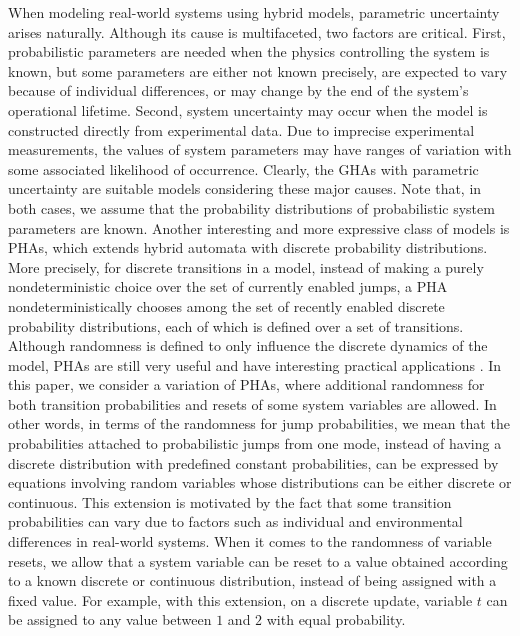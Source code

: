 \vspace{-.2cm}
When modeling real-world systems using hybrid models, parametric uncertainty arises naturally. Although its cause is multifaceted, two factors are critical. First, probabilistic parameters are needed when the physics controlling the system is known, but some parameters are either not known precisely, are expected to vary because of individual differences, or may change by the end of the system's operational lifetime. Second, system uncertainty may occur when the model is constructed directly from experimental data. Due to imprecise experimental measurements, the values of system parameters may have ranges of variation with some associated likelihood of occurrence. Clearly, the GHAs with parametric uncertainty are suitable models considering these major causes. Note that, in both cases, we assume that the probability distributions of probabilistic system parameters are known. Another interesting and more expressive class of models is PHAs, which extends hybrid automata \cite{henzinger2000theory} with discrete probability distributions. More precisely, for discrete transitions in a model, instead of making a purely nondeterministic choice over the set of currently enabled jumps, a PHA nondeterministically chooses among the set of recently enabled discrete probability distributions, each of which is defined over a set of transitions. Although randomness is defined to only influence the discrete dynamics of the model, PHAs are still very useful and have interesting practical applications \cite{spr2001thesis}. In this paper, we consider a variation of PHAs, where additional randomness for both transition probabilities and resets of some system variables are allowed. In other words, in terms of the randomness for jump probabilities, we mean that the probabilities attached to probabilistic jumps from one mode, instead of having a discrete distribution with predefined constant probabilities, can be expressed by equations involving random variables whose distributions can be either discrete or continuous. This extension is motivated by the fact that some transition probabilities can vary due to factors such as individual and environmental differences in real-world systems. When it comes to the randomness of variable resets, we allow that a system variable can be reset to a value obtained according to a known discrete or continuous distribution, instead of being assigned with a fixed value. For example, with this extension, on a discrete update, variable $t$ can be assigned to any value between $1$ and $2$ with equal probability. 

